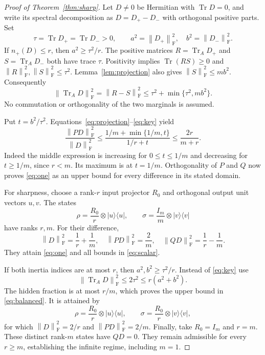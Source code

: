 \documentclass[11pt,a4paper]{article}
\newcommand{\Tr}{\operatorname{Tr}}
\newcommand{\F}{\mathrm F}
\newcommand{\norm}[1]{\left\lVert#1\right\rVert_{\F}}
\begin{document}
\begin{proof}[Proof of Theorem~\ref{thm:sharp}]
Let $D\ne0$ be Hermitian with $\Tr D=0$, and write its spectral
decomposition as $D=D_+-D_-$ with orthogonal positive parts. Set
\[
 \tau=\Tr D_+=\Tr D_->0,\qquad
 a^2=\norm{D_+}^2,\quad b^2=\norm{D_-}^2.
\]
If $n_+(D)\le r$, then $a^2\ge\tau^2/r$. The positive matrices
$R=\Tr_A D_+$ and $S=\Tr_A D_-$ both have trace $\tau$.
Positivity implies $\Tr(RS)\ge0$ and
$\norm R^2,\norm S^2\le\tau^2$. Lemma~\ref{lem:projection} also gives
$\norm S^2\le m b^2$. Consequently
\begin{equation}\label{eq:key}
 \norm{\Tr_A D}^2
 =\norm{R-S}^2
 \le \tau^2+\min\{\tau^2,m b^2\}.
\end{equation}
No commutation or orthogonality of the two marginals is assumed.

Put $t=b^2/\tau^2$. Equations~\eqref{eq:projection}--\eqref{eq:key} yield
\begin{equation}\label{eq:scalar}
 \frac{\norm{PD}^2}{\norm D^2}
 \le \frac{1/m+\min\{1/m,t\}}{1/r+t}
 \le \frac{2r}{m+r}.
\end{equation}
Indeed the middle expression is increasing for $0\le t\le1/m$ and
decreasing for $t\ge1/m$, since $r<m$. Its maximum is at $t=1/m$.
Orthogonality of $P$ and $Q$ now proves \eqref{eq:one} as an upper
bound for every difference in its stated domain.

For sharpness, choose a rank-$r$ input projector $R_0$ and orthogonal
output unit vectors $u,v$. The states
\begin{equation}\label{eq:one-attain}
 \rho=\frac{R_0}{r}\otimes|u\rangle\langle u|,
 \qquad
 \sigma=\frac{I_m}{m}\otimes|v\rangle\langle v|
\end{equation}
have ranks $r,m$. For their difference,
\[
 \norm D^2=\frac1r+\frac1m,\quad
 \norm{PD}^2=\frac2m,\quad
 \norm{QD}^2=\frac1r-\frac1m.
\]
They attain \eqref{eq:one} and all bounds in \eqref{eq:scalar}.

If both inertia indices are at most $r$, then
$a^2,b^2\ge\tau^2/r$. Instead of \eqref{eq:key} use
\[
 \norm{\Tr_A D}^2\le2\tau^2\le r(a^2+b^2).
\]
The hidden fraction is at most $r/m$, which proves the upper bound in
\eqref{eq:balanced}. It is attained by
\[
 \rho=\frac{R_0}{r}\otimes|u\rangle\langle u|,\qquad
 \sigma=\frac{R_0}{r}\otimes|v\rangle\langle v|,
\]
for which $\norm D^2=2/r$ and $\norm{PD}^2=2/m$.
Finally, take $R_0=I_m$ and $r=m$. These distinct rank-$m$ states
have $QD=0$. They remain admissible for every $r\ge m$, establishing
the infinite regime, including $m=1$.
\end{proof}
\end{document}
